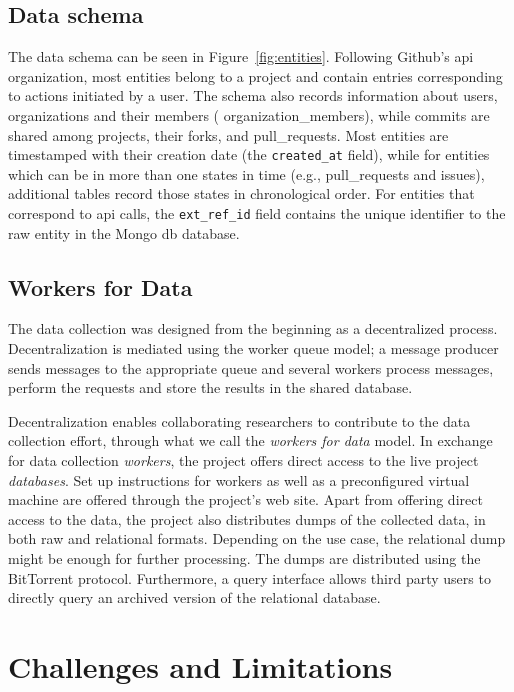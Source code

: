 \documentclass[conference,letter]{IEEEtran}
\begin{document}
\subsection{Data schema}

The data schema can be seen in Figure~\ref{fig:entities}. Following Github's
{\sc api} organization, most entities belong to a {\sf project} and contain
entries corresponding to actions initiated by a {\sf user}. The schema also
records information about {\sf users}, organizations and their members ({\sf
organization\_members}), while {\sf commits} are shared among {\sf projects}, their
forks, and {\sf pull\_requests}.  Most entities are timestamped with their
creation date (the \texttt{created\_at} field), while for entities which can be
in more than one states in time (e.g.,  {\sf pull\_requests} and {\sf issues}),
additional tables record those states in chronological order.  
For entities that correspond to {\sc api} calls, the \texttt{ext\_ref\_id}
field contains the unique identifier to the raw entity in the Mongo{\sc
db} database.

\subsection{Workers for Data}

The data collection was designed from the beginning as a decentralized process.
Decentralization is mediated using the worker queue model; a message producer
sends messages to the appropriate queue and several workers process messages,
perform the requests and store the results in the shared database.

Decentralization enables collaborating researchers to contribute to the data
collection effort, through what we call the \emph{workers for data} model.  In
exchange for data collection \emph{workers}, the project offers direct access to
the live project \emph{databases}. Set up instructions for workers as well as a
preconfigured virtual machine are offered through the project's web site. Apart
from offering direct access to the data, the project also distributes dumps of
the collected data, in both raw and relational formats. Depending on the use
case, the relational dump might be enough for further processing. The dumps are
distributed using the BitTorrent protocol. Furthermore, a query interface
allows third party users to directly query an archived version of the relational
database.

\section{Challenges and Limitations}
\end{document}
